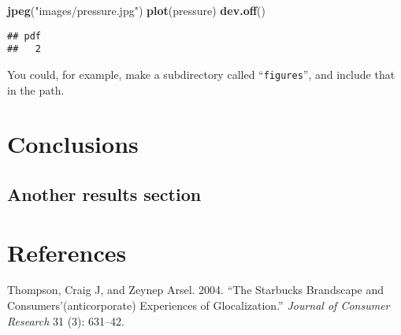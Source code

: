 \documentclass[
  12pt,
  oneside]{book}
\newenvironment{Shaded}{\begin{snugshade}}{\end{snugshade}}
\newcommand{\KeywordTok}[1]{\textcolor[rgb]{0.13,0.29,0.53}{\textbf{#1}}}
\newcommand{\NormalTok}[1]{#1}
\newcommand{\StringTok}[1]{\textcolor[rgb]{0.31,0.60,0.02}{#1}}
\numberwithin{figure}{chapter}
\begin{document}
\begin{Shaded}
\begin{Highlighting}[]
\KeywordTok{jpeg}\NormalTok{(}\StringTok{"images/pressure.jpg"}\NormalTok{)}
\KeywordTok{plot}\NormalTok{(pressure)}
\KeywordTok{dev.off}\NormalTok{()}
\end{Highlighting}
\end{Shaded}

\begin{verbatim}
## pdf 
##   2
\end{verbatim}

You could, for example, make a subdirectory called ``\texttt{figures}'', and include that in the path.

\hypertarget{conclusions}{%
\chapter{Conclusions}\label{conclusions}}

\hypertarget{another-results-section}{%
\section{Another results section}\label{another-results-section}}

\hypertarget{references}{%
\chapter*{References}\label{references}}

\hypertarget{refs}{}
\leavevmode\hypertarget{ref-thompson2004}{}%
Thompson, Craig J, and Zeynep Arsel. 2004. ``The Starbucks Brandscape and Consumers'(anticorporate) Experiences of Glocalization.'' \emph{Journal of Consumer Research} 31 (3): 631--42.

\backmatter
\end{document}
